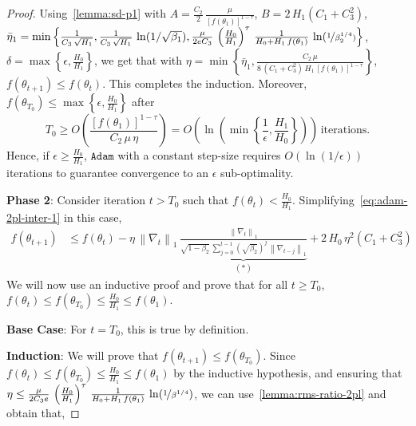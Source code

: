 \documentclass{article}
\newcommand{\norm}[1]{\left\|#1 \right\|}
\newcommand{\tht}{\theta_t}
\newcommand{\thtt}{\theta_{t+1}}
\newcommand{\Adam}{\texttt{Adam}}
\begin{document}
\begin{proof}
Using~\cref{lemma:sd-p1} with $A = \frac{C_2}{2} \, \frac{\mu}{[f(\theta_1)]^{1 - \tau}}$, $B = 2 \, H_1(C_1+ C^2_3)$, $\bar{\eta}_1 = \min\left\{\frac{1}{C_3 \, \sqrt{H_1}}, \frac{1}{C_3 \, \sqrt{H_1}} \, \ln(1/\sqrt{\beta_1}), \frac{\mu }{2 e C_3} \, \left(\frac{H_0}{H_1}\right)^\tau \, \frac{1}{H_0 + H_1 \, f(\theta_1)} \, \ln(\nicefrac{1}{\beta_2^{1/4})} \right\}$, $\delta = \max\left\{\epsilon, \frac{H_0}{H_1} \right\}$, we get that with $\eta = \min\left\{\bar{\eta}_1, \frac{C_2 \, \mu}{8 \, (C_1+ C^2_3) \, H_1 \, [f(\theta_1)]^{1 - \tau}} \right\}$, $f(\thtt) \leq f(\tht)$. This completes the induction. Moreover, $f(\theta_{T_0}) \leq \max\left\{\epsilon, \frac{H_0}{H_1} \right\}$ after 
\[
T_0 \geq O \left(\frac{ [f(\theta_1)]^{1 - \tau}}{C_2 \, \mu \, \eta} \right) = O \left(\ln\left(\min\left\{\frac{1}{\epsilon}, \frac{H_1}{H_0} \right\} \right) \right)\, \text{iterations.}
\]
Hence, if $\epsilon \geq \frac{H_0}{H_1}$, $\Adam$ with a constant step-size requires $O(\ln(1/\epsilon))$ iterations to guarantee convergence to an $\epsilon$ sub-optimality. 

\textbf{Phase 2}: Consider iteration $t > T_0$ such that $f(\tht) < \frac{H_0}{H_1}$. Simplifying~\cref{eq:adam-2pl-inter-1} in this case, 
\begin{align}
f(\thtt) & \leq f(\tht) - \eta \, \norm{\nabla_t}_1 \, \underbrace{\frac{\norm{\nabla_t}_1}{\sqrt{1 - \beta_2} \, \sum_{j = 0}^{t-1} (\sqrt{\beta_2})^{j} \, \norm{\nabla_{t-j}}_1}}_{(*)} + 2 \, H_0  \, \eta^2 (C_1+ C^2_3)     \label{eq:adam-2pl-p1-2}
\end{align}
We will now use an inductive proof and prove that for all $t \geq T_0$, $f(\tht) \leq f(\theta_{T_0}) \leq \frac{H_0}{H_1} \leq f(\theta_1)$. 

\textbf{Base Case}: For $t = T_0$, this is true by definition. 

\textbf{Induction}: We will prove that $f(\thtt) \leq f(\theta_{T_0})$. Since $f(\tht) \leq f(\theta_{T_0}) \leq \frac{H_0}{H_1} \leq f(\theta_1)$ by the inductive hypothesis, and ensuring that $\eta \leq \frac{\mu  }{2C_3 e} \, \left(\frac{H_0}{H_1}\right)^{\tau} \, \frac{1}{H_0 + H_1 \, f(\theta_1)} \, \ln(\nicefrac{1}{\beta^{1/4}})$, we can use~\cref{lemma:rms-ratio-2pl} and obtain that, 


\end{proof}
\end{document}
